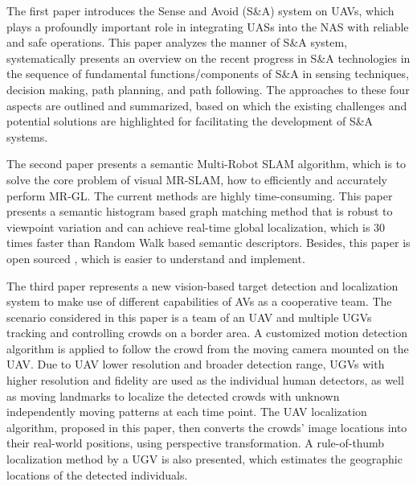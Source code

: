 The first paper introduces the Sense and Avoid (S\&A) system on \ac{UAVs}, which plays a profoundly important role in integrating UASs into the \ac{NAS} with reliable and safe operations. This paper analyzes the manner of S\&A system, systematically presents an overview on the recent progress in S\&A technologies in the sequence of fundamental functions/components of S\&A in sensing techniques, decision making, path planning, and path following. The approaches to these four aspects are outlined and summarized, based on which the existing challenges and potential solutions are highlighted for facilitating the development of S\&A systems.

The second paper presents a semantic Multi-Robot \ac{SLAM} algorithm, which is to solve the core problem of visual \ac{MR-SLAM}, how to efficiently and accurately perform \ac{MR-GL}. The current methods are highly time-consuming. This paper presents a semantic histogram based graph matching method that is robust to viewpoint variation and can achieve real-time global localization, which is 30 times faster than Random Walk based semantic descriptors. Besides, this paper is open sourced \parencite{website:gxy_mrslam}, which is easier to understand and implement.

The third paper represents a new vision-based target detection and localization system to make use of different capabilities of \ac{AVs} as a cooperative team. The scenario considered in this paper is a team of an UAV and multiple \ac{UGVs} tracking and controlling crowds on a border area. A customized motion detection algorithm is applied to follow the crowd from the moving camera mounted on the UAV. Due to UAV lower resolution and broader detection range, \ac{UGVs} with higher resolution and fidelity are used as the individual human detectors, as well as moving landmarks to localize the detected crowds with unknown independently moving patterns at each time point. The UAV localization algorithm, proposed in this paper, then converts the crowds' image locations into their real-world positions, using perspective transformation. A rule-of-thumb localization method by a UGV is also presented, which estimates the geographic locations of the detected individuals.